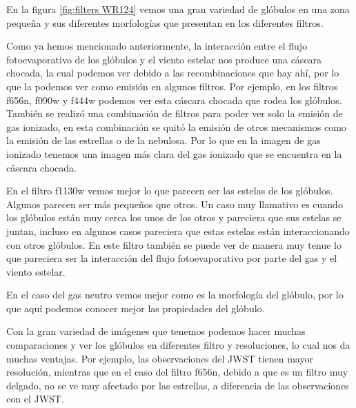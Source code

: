 \documentclass{book}
\begin{document}
En la figura \ref{fig:filters WR124} vemos una gran variedad de glóbulos en una zona pequeña y sus diferentes morfologías que presentan en los diferentes filtros. 

Como ya hemos mencionado anteriormente, la interacción entre el flujo fotoevaporativo de los glóbulos y el viento estelar nos produce una cáscara chocada, la cual podemos ver debido a las recombinaciones que hay ahí, por lo que la podemos ver como emisión en algunos filtros. Por ejemplo, en los filtros f656n, f090w y f444w podemos ver esta cáscara chocada que rodea los glóbulos. También se realizó una combinación de filtros para poder ver solo la emisión de gas ionizado, en esta combinación se quitó la emisión de otros mecanismos como la emisión de las estrellas o de la nebulosa. Por lo que en la imagen de gas ionizado tenemos una imagen más clara del gas ionizado que se encuentra en la cáscara chocada.

En el filtro f1130w vemos mejor lo que parecen ser las estelas de los glóbulos. Algunos parecen ser más pequeños que otros. Un caso muy llamativo es cuando los glóbulos están muy cerca los unos de los otros y pareciera que sus estelas se juntan, incluso en algunos casos pareciera que estas estelas están interaccionando con otros glóbulos. En este filtro también se puede ver de manera muy tenue lo que pareciera ser la interacción del flujo fotoevaporativo por parte del gas y el viento estelar.

En el caso del gas neutro vemos mejor como es la morfología del glóbulo, por lo que aquí podemos conocer mejor las propiedades del glóbulo.

Con la gran variedad de imágenes que tenemos podemos hacer muchas comparaciones y ver los glóbulos en diferentes filtro y resoluciones, lo cual nos da muchas ventajas. Por ejemplo, las observaciones del JWST tienen mayor resolución, mientras que en el caso del filtro f656n, debido a que es un filtro muy delgado, no se ve muy afectado por las estrellas, a diferencia de las observaciones con el JWST.
\end{document}
